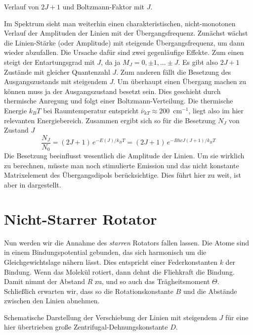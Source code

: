 \begin{marginfigure}
\caption{Verlauf von $2J +1$ und Boltzmann-Faktor mit $J$.}
\end{marginfigure}


Im Spektrum sieht man weiterhin einen charakteristischen, nicht-monotonen Verlauf der Amplituden der Linien mit der Übergangsfrequenz. Zunächst wächst die Linien-Stärke (oder Amplitude) mit steigende Übergangsfrequenz, um dann wieder abzufallen. Die Ursache dafür sind zwei gegenläufige Effekte. Zum einen steigt der Entartungsgrad mit $J$, da ja $M_J = 0, \pm 1, ... \pm J$. Es gibt also $2J+1$ Zustände mit gleicher Quantenzahl $J$.
Zum anderen fällt die Besetzung des Ausgangszustands mit steigendem $J$. Um überhaupt einen Übergang machen zu können muss ja der Ausgangszustand besetzt sein. Dies geschieht durch thermische Anregung und folgt einer Boltzmann-Verteilung. Die thermische Energie $k_B T$ bei Raumtemperatur entspricht  $\bar{\nu}_{k T} \approx 200$~cm$^{-1}$, liegt also im hier relevanten Energiebereich. Zusammen ergibt sich so für die Besetzung $N_J$ von Zustand $J$
\begin{equation}
 \frac{N_J}{N_0}= (2J+1) \, e^{- E(J) / k_B T} = (2J+1) \, e^{- B hc J (J+1) / k_B T} 
\end{equation}
Die Besetzung beeinflusst wesentlich die Amplitude der Linien. Um sie wirklich zu berechnen, müsste man noch stimulierte Emission und das nicht konstante Matrixelement des Übergangsdipols berücksichtige. Dies führt hier zu weit, ist aber in \citep{Demtröder_molekuelphysik} dargestellt.





\section{Nicht-Starrer Rotator}

Nun werden wir die Annahme des \emph{starren} Rotators fallen lassen. Die Atome sind in einem Bindungspotential gebunden, das sich harmonisch um die Gleichgewichtslage nähern lässt. Dies entspricht einer Federkonstanten $k$ der Bindung. Wenn das Molekül rotiert, dann dehnt die Fliehkraft die Bindung. Damit nimmt der Abstand $R$ zu, und so auch das Trägheitsmoment $\Theta$. Schließlich erwarten wir, dass so die Rotationskonstante $B$ und die Abstände zwischen den Linien abnehmen.


\begin{marginfigure}

\caption{Schematische Darstellung der Verschiebung der Linien mit steigendem $J$ für eine hier übertrieben große Zentrifugal-Dehnungskonstante $D$.}
\end{marginfigure}


